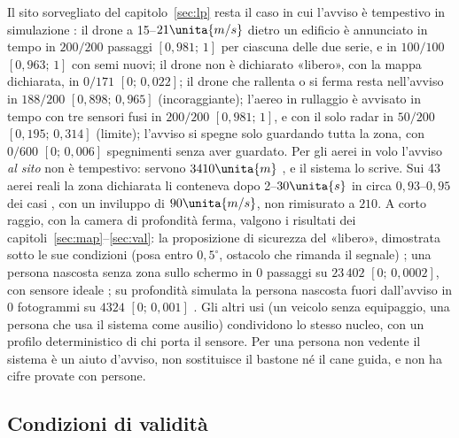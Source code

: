 Il sito sorvegliato del capitolo~\ref{sec:lp} resta il caso in cui l'avviso è tempestivo in simulazione : il drone a 15--$21\unita{m/s}$ dietro un edificio è annunciato in tempo in $200/200$ passaggi $[0{,}981;\,1]$ per ciascuna delle due serie, e in $100/100$ $[0{,}963;\,1]$ con semi nuovi; il drone non è dichiarato «libero», con la mappa dichiarata, in $0/171$ $[0;\,0{,}022]$; il drone che rallenta o si ferma resta nell'avviso in $188/200$ $[0{,}898;\,0{,}965]$ (incoraggiante); l'aereo in rullaggio è avvisato in tempo con tre sensori fusi in $200/200$ $[0{,}981;\,1]$, e con il solo radar in $50/200$ $[0{,}195;\,0{,}314]$ (limite); l'avviso si spegne solo guardando tutta la zona, con $0/600$ $[0;\,0{,}006]$ spegnimenti senza aver guardato. Per gli aerei in volo l'avviso \emph{al sito} non è tempestivo: servono $3410\unita{m}$ , e il sistema lo scrive. Sui 43 aerei reali la zona dichiarata li conteneva dopo 2--$30\unita{s}$ in circa $0{,}93$--$0{,}95$ dei casi , con un inviluppo di $90\unita{m/s}$, non rimisurato a $210$. A corto raggio, con la camera di profondità ferma, valgono i risultati dei capitoli~\ref{sec:map}--\ref{sec:val}: la proposizione di sicurezza del «libero», dimostrata sotto le sue condizioni (posa entro $0{,}5^\circ$, ostacolo che rimanda il segnale) ; una persona nascosta senza zona sullo schermo in $0$ passaggi su $23\,402$ $[0;\,0{,}0002]$, con sensore ideale ; su profondità simulata la persona nascosta fuori dall'avviso in $0$ fotogrammi su $4324$ $[0;\,0{,}001]$ . Gli altri usi (un veicolo senza equipaggio, una persona che usa il sistema come ausilio) condividono lo stesso nucleo, con un profilo deterministico di chi porta il sensore. Per una persona non vedente il sistema è un aiuto d'avviso, non sostituisce il bastone né il cane guida, e non ha cifre provate con persone.

\subsection{Condizioni di validità}\label{sec:vo-validita}

